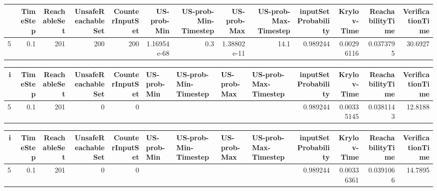 \begin{tabular}{rrrrrrrrrrrrr}
\begin{tabular}{rrrrrrrrrrrrr}
\hline
   i &   TimeStep &   ReachableSet &   UnsafeReachableSet &   CounterInputSet &   US-prob-Min &   US-prob-Min-Timestep &   US-prob-Max &   US-prob-Max-Timestep &   inputSet Probability &   Krylov-Time &   ReachabilityTime &   VerificationTime \\
\hline
   5 &        0.1 &            201 &                  200 &               200 &   1.16954e-68 &                    0.3 &   1.38802e-11 &                   14.1 &               0.989244 &    0.00296116 &          0.0373795 &            30.6927 \\
\hline
\end{tabular}
\begin{tabular}{rrrrrllllrrrr}
\hline
   i &   TimeStep &   ReachableSet &   UnsafeReachableSet &   CounterInputSet & US-prob-Min   & US-prob-Min-Timestep   & US-prob-Max   & US-prob-Max-Timestep   &   inputSet Probability &   Krylov-Time &   ReachabilityTime &   VerificationTime \\
\hline
   5 &        0.1 &            201 &                    0 &                 0 &               &                        &               &                        &               0.989244 &    0.00335145 &          0.0381143 &            12.8188 \\
\hline
\end{tabular}
\begin{tabular}{rrrrrllllrrrr}
\hline
   i &   TimeStep &   ReachableSet &   UnsafeReachableSet &   CounterInputSet & US-prob-Min   & US-prob-Min-Timestep   & US-prob-Max   & US-prob-Max-Timestep   &   inputSet Probability &   Krylov-Time &   ReachabilityTime &   VerificationTime \\
\hline
   5 &        0.1 &            201 &                    0 &                 0 &               &                        &               &                        &               0.989244 &    0.00336361 &          0.0391066 &            14.7895 \\
\hline
\end{tabular}

